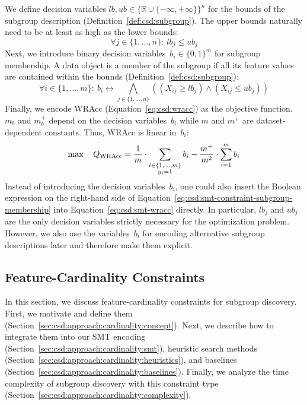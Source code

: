 \documentclass[acmsmall]{acmart} %
\theoremstyle{acmplain}
\theoremstyle{acmdefinition}
\begin{document}
We define decision variables $\mathit{lb}, \mathit{ub} \in \{\mathbb{R} \cup \{-\infty, +\infty\}\}^n$ for the bounds of the subgroup description (Definition~\ref{def:csd:subgroup}).
The upper bounds naturally need to be at least as high as the lower bounds:
%
\begin{equation}
	\forall j \in \{1, \dots, n\}:~ \mathit{lb}_j\leq \mathit{ub}_j
	\label{eq:csd:smt-constraint-bounds-monotonic}
\end{equation}
%
Next, we introduce binary decision variables~$b_i \in \{0, 1\}^m$ for subgroup membership.
A data object is a member of the subgroup if all its feature values are contained within the bounds (Definition~\ref{def:csd:subgroup}):
%
\begin{equation}
	\forall i \in \{1, \dots, m\}:~ b_i\leftrightarrow \bigwedge_{j \in \{1, \dots, n\}} \left( \left( X_{ij} \geq \mathit{lb}_j \right) \land \left( X_{ij} \leq \mathit{ub}_j \right) \right)
	\label{eq:csd:smt-constraint-subgroup-membership}
\end{equation}
%
Finally, we encode WRAcc (Equation~\ref{eq:csd:wracc}) as the objective function.
$m_b$ and $m_b^+$ depend on the decision variables~$b_i$ while $m$ and $m^+$ are dataset-dependent constants.
Thus, WRAcc is linear in~$b_i$:
%
\begin{equation}
	\max \quad Q_{\text{WRAcc}} = \frac{1}{m} \cdot \sum_{\substack{i \in \{1, \dots, m\} \\ y_i = 1 }} b_i - \frac{m^+}{m^2} \cdot \sum_{i=1}^{m} b_i \\
	\label{eq:csd:smt-wracc}
\end{equation}
%
Instead of introducing the decision variables~$b_i$, one could also insert the Boolean expression on the right-hand side of Equation~\ref{eq:csd:smt-constraint-subgroup-membership} into Equation~\ref{eq:csd:smt-wracc} directly.
In particular, $\mathit{lb}_j$ and $\mathit{ub}_j$ are the only decision variables strictly necessary for the optimization problem.
However, we also use the variables~$b_i$ for encoding alternative subgroup descriptions later and therefore make them explicit.

\subsection{Feature-Cardinality Constraints}
\label{sec:csd:approach:cardinality}

In this section, we discuss feature-cardinality constraints for subgroup discovery.
First, we motivate and define them (Section~\ref{sec:csd:approach:cardinality:concept}).
Next, we describe how to integrate them into our SMT encoding (Section~\ref{sec:csd:approach:cardinality:smt}), heuristic search methods (Section~\ref{sec:csd:approach:cardinality:heuristics}), and baselines (Section~\ref{sec:csd:approach:cardinality:baselines}).
Finally, we analyze the time complexity of subgroup discovery with this constraint type (Section~\ref{sec:csd:approach:cardinality:complexity}).
\end{document}

